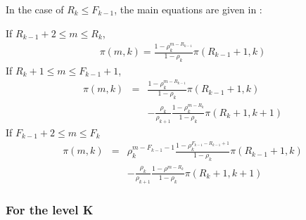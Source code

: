 \documentclass[conference]{IEEEtran}
\begin{document}
In the case of $R_{k} \leq F_{k-1}$, the main equations are given in \cite{le2000simple}: 



If  $R_{k-1}+2 \leq m \leq R_k$,  
\begin{eqnarray}
\pi(m,k)=\frac{1-\rho_k^{m-R_{k-1}}}{1-\rho_k} \pi(R_{k-1}+1,k)
\label{eqB1}
\end{eqnarray} 
If $R_k+1 \leq m \leq F_{k-1}+1$, 
\begin{eqnarray} 
 \pi(m,k)&=&\frac{1-\rho_k^{m-R_{k-1} }} {1-\rho_k} \pi(R_{k-1}+1,k) \nonumber\\
&&-\frac{\rho_k}{\rho_{k+1}} \frac{1- \rho_k^{m-R_k}}{1-\rho_k} \pi(R_k+1,k+1) 
\label{eqB2}
 \end{eqnarray} 
If $F_{k-1}+2 \leq m \leq F_k$ 
 \begin{eqnarray} 
 \pi(m,k)&= & \rho_k^{m-F_{k-1}-1} \frac{1-\rho_k^{F_{k-1}-R_{k-1}+1}} {1-\rho_k} \pi(R_{k-1}+1,k) \nonumber \\
 &&- \frac{\rho_k}{\rho_{k+1}}
\frac{1-\rho^{m-R_k}}{1-\rho_k} \pi(R_{k}+1,k+1) 
\label{eqB3}
 \end{eqnarray} 

\subsubsection{For the level K}
\end{document}
